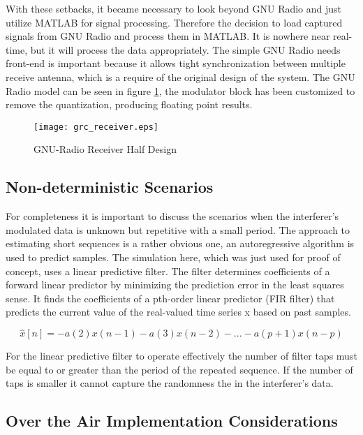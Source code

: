 With these setbacks, it became necessary to look beyond GNU Radio and just utilize MATLAB for signal processing.  Therefore the decision to load captured signals from GNU Radio and process them in MATLAB.  It is nowhere near real-time, but it will process the data appropriately.  The simple GNU Radio needs front-end is important because it allows tight synchronization between multiple receive antenna, which is a require of the original design of the system.  The GNU Radio model can be seen in figure \ref{grc_receiver}, the modulator block has been customized to remove the quantization, producing floating point results.\\

\begin{figure}[!ht]\label{grc_receiver}
\centering
\texttt{[image: grc\_receiver.eps]}
\caption{GNU-Radio Receiver Half Design}
\end{figure}

\subsection{Non-deterministic Scenarios}

For completeness it is important to discuss the scenarios when the interferer's modulated data is unknown but repetitive with a small period.  The approach to estimating short sequences is a rather obvious one, an autoregressive algorithm is used to predict samples.  The simulation here, which was just used for proof of concept, uses a linear predictive filter.  The filter determines coefficients of a forward linear predictor by minimizing the prediction error in the least squares sense\cite{lpcfilter}.  It finds the coefficients of a pth-order linear predictor (FIR filter) that predicts the current value of the real-valued time series x based on past samples.

\[ \hat{x}[n]=-a(2)x(n-1)-a(3)x(n-2)-...-a(p+1)x(n-p)\]

For the linear predictive filter to operate effectively the number of filter taps must be equal to or greater than the period of the repeated sequence.  If the number of taps is smaller it cannot capture the randomness the in the interferer's data.\\

\subsection{Over the Air Implementation Considerations}

